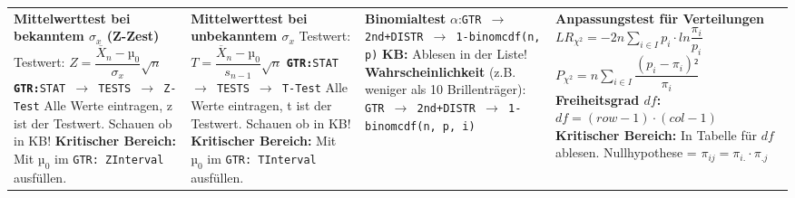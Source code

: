 \documentclass[fleqn, oneside, 10pt, titlepage]{article}
\begin{document}
\scriptsize{
\begin{tabularx}{\textwidth}{p{15em}p{15em}p{15em}p{15em}}
\textbf{Mittelwerttest bei bekanntem $\sigma_x$ (Z-Zest)}\newline
 Testwert: $Z = \dfrac{\overline{X}_n - µ_0}{\sigma_x} \sqrt{n}$\newline
 \textbf{\texttt{GTR:}}\texttt{STAT $\rightarrow$ TESTS $\rightarrow$ Z-Test}\newline
 Alle Werte eintragen, z ist der Testwert. Schauen ob in KB!\newline
 \textbf{Kritischer Bereich:}\newline
 Mit $µ_0$ im \texttt{GTR: ZInterval} ausfüllen.
 
 &
 \textbf{Mittelwerttest bei unbekanntem $\sigma_x$}\newline
 Testwert: $T = \dfrac{\overline{X}_n - µ_0}{s_{n-1}} \sqrt{n}$\newline
 \textbf{\texttt{GTR:}}\texttt{STAT $\rightarrow$ TESTS $\rightarrow$ T-Test}\newline
 Alle Werte eintragen, t ist der Testwert. Schauen ob in KB!\newline
 \textbf{Kritischer Bereich:}\newline
 Mit $µ_0$ im \texttt{GTR: TInterval} ausfüllen.
 &
 \textbf{Binomialtest}\newline
 $\alpha$:\newline \texttt{GTR $\rightarrow$ 2nd+DISTR $\rightarrow$ 1-binomcdf(n, p)}\newline
 \textbf{KB:} Ablesen in der Liste!\newline
 \textbf{Wahrscheinlichkeit} (z.B. weniger als 10 Brillenträger):\newline
 \texttt{GTR $\rightarrow$ 2nd+DISTR $\rightarrow$ 1-binomcdf(n, p, i)}\newline
 &
\textbf{Anpassungstest für Verteilungen}\newline
$LR_{\chi^2} = -2n \sum\limits_{i\in I} p_i\cdot ln\dfrac{\pi_i}{p_i}$\newline
$P_{\chi^2} = n \sum\limits_{i\in I} \dfrac{(p_i - \pi_i)²}{\pi_i}$\newline
\textbf{Freiheitsgrad $df$:}\newline
$df = (row - 1) \cdot (col-1)$\newline
\textbf{Kritischer Bereich:}\newline
In Tabelle für $df$ ablesen. \newline
Nullhypothese = $\pi_{ij} = \pi_{i.} \cdot \pi_{.j}$
\end{tabularx} 
}
\end{document}
